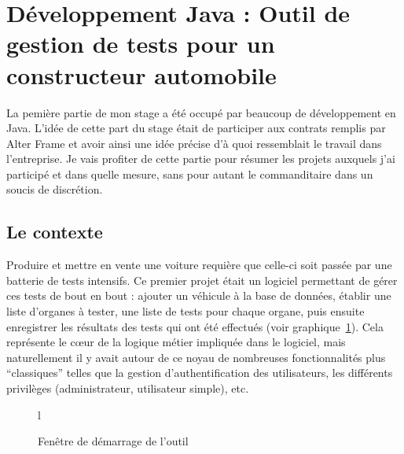 \section{Développement Java : Outil de gestion de tests pour un constructeur automobile}
La pemière partie de mon stage a été occupé par beaucoup de développement en Java. L'idée de cette part du stage était de participer aux contrats remplis par Alter Frame et avoir ainsi une idée précise d'à quoi ressemblait le travail dans l'entreprise. Je vais profiter de cette partie pour résumer les projets auxquels j'ai participé et dans quelle mesure, sans pour autant le commanditaire dans un soucis de discrétion.

\subsection{Le contexte}
Produire et mettre en vente une voiture requière que celle-ci soit passée par une batterie de tests intensifs. Ce premier projet était un logiciel permettant de gérer ces tests de bout en bout : ajouter un véhicule à la base de données, établir une liste d'organes à tester, une liste de tests pour chaque organe, puis ensuite enregistrer les résultats des tests qui ont été effectués (voir graphique~\ref{fig:acceuil}). Cela représente le c\oe{}ur de la logique métier impliquée dans le logiciel, mais naturellement il y avait autour de ce noyau de nombreuses fonctionnalités plus ``classiques'' telles que la gestion d'authentification des utilisateurs, les différents privilèges (administrateur, utilisateur simple), etc.

\begin{figure}{l}
  \caption{Fenêtre de démarrage de l'outil}
  \label{fig:acceuil}
\end{figure}


